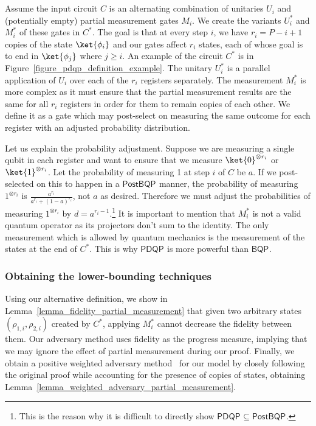 \documentclass[10pt,a4paper]{article}
\newcommand{\abilityamount}[0]{\ensuremath{P}\xspace} %
\newcommand{\quantumstate}[1]{\ensuremath{\ket{\phi_{#1}}}\xspace}
\newcommand{\unitarygate}[2][]{\ensuremath{U^{#1}_{#2}}\xspace}
\newcommand{\measurementgate}[2][]{\ensuremath{M^{#1}_{#2}}\xspace}
\newcommand{\compclass}[2][]{\ensuremath{\mathsf{#2}^{#1}}\xspace}
\newcommand{\pdqpname}[0]{\compclass{PDQP}}
\newcommand{\bqpname}[0]{\compclass{BQP}}
\newcommand{\postbqpname}[0]{\compclass{PostBQP}}
\begin{document}
Assume the input circuit $C$ is an alternating combination of unitaries \unitarygate{i} and (potentially empty) partial measurement gates \measurementgate{i}. We create the variants \unitarygate[*]{i} and \measurementgate[*]{i} of these gates in $C^*$. The goal is that at every step $i$, we have $r_i = \abilityamount - i + 1$ copies of the state \quantumstate{i} and our gates affect $r_i$ states, each of whose goal is to end in \quantumstate{j} where $j\geq i$. An example of the circuit $C^*$ is in Figure~\ref{figure_pdqp_definition_example}. The unitary \unitarygate[*]{i} is a parallel application of \unitarygate{i} over each of the $r_i$ registers separately. The measurement \measurementgate[*]{i} is more complex as it must ensure that the partial measurement results are the same for all $r_i$ registers in order for them to remain copies of each other. We define it as a gate which may post-select on measuring the same outcome for each register with an adjusted probability distribution.

Let us explain the probability adjustment. Suppose we are measuring a single qubit in each register and want to ensure that we measure $\ket{0}^{\otimes r_i}$ or $\ket{1}^{\otimes r_i}$. Let the probability of measuring 1 at step $i$ of $C$ be $a$. If we post-selected on this to happen in a \postbqpname manner, the probability of measuring $1^{\otimes r_i}$ is $\frac{a^{r_i}}{a^{r_i}+(1-a)^{r_i}}$, not $a$ as desired. Therefore we must adjust the probabilities of measuring $1^{\otimes r_i}$ by $d = a^{r_i-1}$.\footnote{This is the reason why it is difficult to directly show $\pdqpname \subseteq \postbqpname$.} It is important to mention that \measurementgate[*]{i} is not a valid quantum operator as its projectors don't sum to the identity. The only measurement which is allowed by quantum mechanics is the measurement of the states at the end of $C^*$. This is why \pdqpname is more powerful than \bqpname.

\subsubsection{Obtaining the lower-bounding techniques}

Using our alternative definition, we show in Lemma~\ref{lemma_fidelity_partial_measurement} that given two arbitrary states $(\rho_{1,i},\rho_{2,i})$ created by $C^*$, applying \measurementgate[*]{i} cannot decrease the fidelity between them. Our adversary method uses fidelity as the progress measure, implying that we may ignore the effect of partial measurement during our proof. Finally, we obtain a positive weighted adversary method~\cite{weighted_adversary} for our model by closely following the original proof while accounting for the presence of copies of states, obtaining Lemma~\ref{lemma_weighted_adversary_partial_measurement}.
\end{document}
